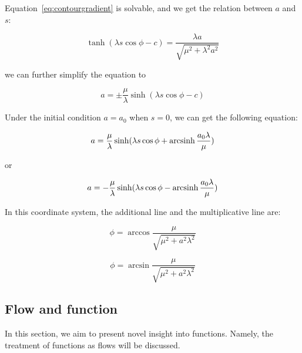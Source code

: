 Equation~\eqref{eq:contourgradient} is solvable, and we get the relation between $a$ and $s$:

\begin{equation}\label{eq:rel_a_s}
    \tanh(\lambda s \cos \phi - c) = \frac{\lambda a}{\sqrt{\mu^2 + \lambda^2 a^2}}
\end{equation}

we can further simplify the equation to

\begin{equation}
  a = \pm \frac{\mu}{\lambda} \sinh(\lambda s \cos \phi - c)\label{eq:gradevo}
\end{equation}

Under the initial condition $a = a_0$ when $s = 0$, we can get the following equation:

\begin{equation}
    a = \frac{\mu}{\lambda} \sinh(\lambda s \cos \phi + \operatorname{arcsinh} \frac{a_0 \lambda}{\mu})\label{eq:gradevo2}
\end{equation}

or

\begin{equation}
    a = - \frac{\mu}{\lambda} \sinh(\lambda s \cos \phi - \operatorname{arcsinh} \frac{a_0 \lambda}{\mu})\label{eq:gradevo3}
\end{equation}

In this coordinate system, the additional line and the multiplicative line are:

\begin{equation}
    \phi = \arccos \frac{\mu}{\sqrt {\mu^2 + a^2 \lambda^2}} \label{eq:additionalline}
\end{equation}

\begin{equation}
    \phi = \arcsin \frac{\mu}{\sqrt {\mu^2 + a^2 \lambda^2}}\label {eq:mulitiplcativeline}
\end{equation}

\subsection{Flow and function}\label{subsec:flow-and-function}

In this section, we aim to present novel insight into functions.
Namely, the treatment of functions as flows will be discussed.

